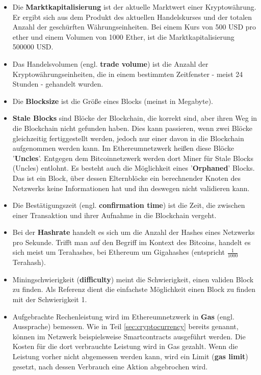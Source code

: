\begin{itemize}
\item Die \textbf{Marktkapitalisierung} ist der aktuelle Marktwert einer Kryptowährung. Er ergibt sich aus dem Produkt des aktuellen Handelskurses und der totalen Anzahl der geschürften Währungseinheiten. Bei einem Kurs von 500 USD pro \gls{ether} und einem Volumen von 1000 Ether, ist die Marktkapitalisierung 500000 USD.
\item Das Handelsvolumen (engl. \textbf{trade volume}) ist die Anzahl der Kryptowährungseinheiten, die in einem bestimmten Zeitfenster - meist 24 Stunden - gehandelt wurden.
\item Die \textbf{Blocksize} ist die Größe eines Blocks (meinst in Megabyte).
\item \textbf{Stale Blocks} sind Blöcke der Blockchain, die korrekt sind, aber ihren Weg in die Blockchain nicht gefunden haben. Dies kann passieren, wenn zwei Blöcke gleichzeitig fertiggestellt werden, jedoch nur einer davon in die Blockchain aufgenommen werden kann.\citep{bitcoinproject_stale_2017} Im Ethereumnetzwerk heißen diese Blöcke '\textbf{Uncles}'. Entgegen dem Bitcoinnetzwerk werden dort Miner für Stale Blocks (Uncles) entlohnt.\citep{jdebunt_what_2017} Es besteht auch die Möglichkeit eines '\textbf{Orphaned}' Blocks. Das ist ein Block, über dessen Elternblöcke ein berechnender Knoten des Netzwerks keine Informationen hat und ihn deswegen nicht validieren kann.\citep{bitcoinproject_orphan_2017}
\item Die Bestätigungszeit (engl. \textbf{confirmation time}) ist die Zeit, die zwischen einer Transaktion und ihrer Aufnahme in die Blockchain vergeht.\citep{kumar_cryptocurrency_2017}
\item Bei der \textbf{Hashrate} handelt es sich um die Anzahl der Hashes eines Netzwerks pro Sekunde. Trifft man auf den Begriff im Kontext des Bitcoins, handelt es sich meist um Terahashes, bei Ethereum um Gigahashes (entspricht $ \frac{1}{1000}$ Terahash).\citep{kumar_cryptocurrency_2017}
\item Miningschwierigkeit (\textbf{difficulty}) meint die Schwierigkeit, einen validen Block zu finden. Als Referenz dient die einfachste Möglichkeit einen Block zu finden mit der Schwierigkeit 1.\citep{bitcoinproject_difficulty_2017}
\item Aufgebrachte Rechenleistung wird im Ethereumnetzwerk in \textbf{Gas} (engl. Aussprache) bemessen. Wie in Teil \ref{sec:cryptocurrency} bereits genannt, können im Netzwerk beispielsweise Smartcontracts ausgeführt werden. Die Kosten für die dort verbrauchte Leistung wird in Gas gezahlt. Wenn die Leistung vorher nicht abgemessen werden kann, wird ein Limit (\textbf{gas limit}) gesetzt, nach dessen Verbrauch eine Aktion abgebrochen wird.\citep[S.~4]{wood_ethereum:_2014}
\end{itemize}


